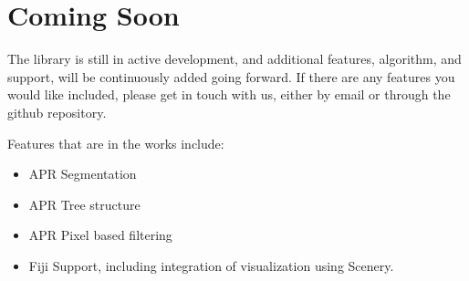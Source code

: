 \documentclass[12pt]{article}
\begin{document}
\section{Coming Soon}
The library is still in active development, and additional features, algorithm, and support, will be continuously added going forward. If there are any features you would like included, please get in touch with us, either by email or through the github repository.

Features that are in the works include:
\begin{itemize}
	\item APR Segmentation
	\item APR Tree structure
	\item APR Pixel based filtering
	\item Fiji Support, including integration of visualization using Scenery.
\end{itemize}
\end{document}
